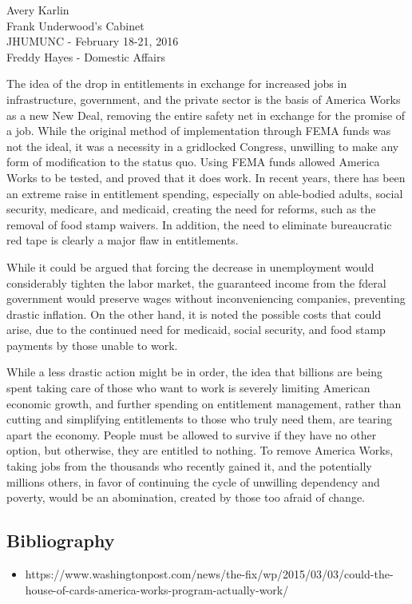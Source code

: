 \documentclass[12pt]{article}
\begin{document}
\begin{flushleft}
Avery Karlin \\
Frank Underwood's Cabinet \\
JHUMUNC - February 18-21, 2016 \\
Freddy Hayes - Domestic Affairs
\end{flushleft}

The idea of the drop in entitlements in exchange for increased jobs in infrastructure, government, and the private sector is the basis of America Works as a new New Deal, removing the entire safety net in exchange for the promise of a job. While the original method of implementation through FEMA funds was not the ideal, it was a necessity in a gridlocked Congress, unwilling to make any form of modification to the status quo. Using FEMA funds allowed America Works to be tested, and proved that it does work. In recent years, there has been an extreme raise in entitlement spending, especially on able-bodied adults, social security, medicare, and medicaid, creating the need for reforms, such as the removal of food stamp waivers. In addition, the need to eliminate bureaucratic red tape is clearly a major flaw in entitlements.

While it could be argued that forcing the decrease in unemployment would considerably tighten the labor market, the guaranteed income from the fderal government would preserve wages without inconveniencing companies, preventing drastic inflation. On the other hand, it is noted the possible costs that could arise, due to the continued need for medicaid, social security, and food stamp payments by those unable to work.

While a less drastic action might be in order, the idea that billions are being spent taking care of those who want to work is severely limiting American economic growth, and further spending on entitlement management, rather than cutting and simplifying entitlements to those who truly need them, are tearing apart the economy. People must be allowed to survive if they have no other option, but otherwise, they are entitled to nothing. To remove America Works, taking jobs from the thousands who recently gained it, and the potentially millions others, in favor of continuing the cycle of unwilling dependency and poverty, would be an abomination, created by those too afraid of change.

\subsection*{Bibliography}
\begin{itemize}
\item https://www.washingtonpost.com/news/the-fix/wp/2015/03/03/could-the-house-of-cards-america-works-program-actually-work/
\end{itemize}
\end{document}
